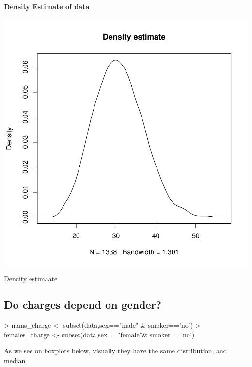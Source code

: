 \documentclass{article}
\begin{document}
\paragraph{Density Estimate of data \newline}
\begin{centerfig}
\includegraphics{Untitled-036}
\caption{Dencity estimaate}
\end{centerfig}

\subsection{Do charges depend on gender?}


\begin{Schunk}
\begin{Sinput}
> mans_charge <- subset(data,sex=="male" & smoker=='no')
> females_charge <- subset(data,sex=="female"& smoker=='no')
\end{Sinput}
\end{Schunk}

As we see on boxplots below, visually they have the same distribution, and median
\end{document}
